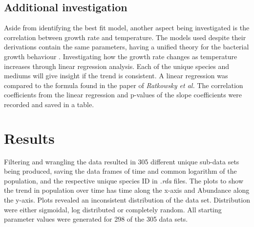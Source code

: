 \documentclass[11pt]{article}
\begin{document}
\subsection{Additional investigation}

Aside from identifying the best fit model, another aspect being investigated is the correlation between growth rate and temperature. The models used despite their derivations contain the same parameters, having a unified theory for the bacterial growth behaviour \cite{levins1966strategy}. Investigating how the growth rate changes as temperature increases through linear regression analysis. Each of the unique species and mediums will give insight if the trend is consistent. A linear regression was compared to the formula found in the paper of \textit{Ratkowsky et al.} The correlation coefficients from the linear regression and p-values of the slope coefficients were recorded and saved in a table.

\section{Results}
Filtering and wrangling the data resulted in 305 different unique sub-data sets being produced, saving the data frames of time and common logarithm of the population, and the respective unique species ID in \textit{.rda} files. The plots to show the trend in population over time has time along the x-axis and Abundance along the y-axis. Plots revealed an inconsistent distribution of the data set. Distribution were either sigmoidal, log distributed or completely random.  All starting parameter values were generated for 298 of the 305 data sets.
\end{document}
